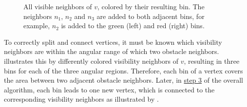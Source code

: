 			\begin{figure}[h]
				\begin{figcenter}
				\end{figcenter}
				\caption[Example of vertices sorted into obstacle neighbor-based bins.]{
					All visible neighbors of $v$, colored by their resulting bin.
					The neighbors $n_1$, $n_2$ and $n_3$ are added to both adjacent bins, for example, $n_2$ is added to the green (left) and red (right) bins.
				}
				\label{fig:visibility-bin-sorting}
			\end{figure}
			
			To correctly split and connect vertices, it must be known which visibility neighbors are within the angular range of which two obstacle neighbors.
			 illustrates this by differently colored visibility neighbors of $v$, resulting in three bins for each of the three angular regions.
			Therefore, each bin of a vertex covers the area between two adjacent obstacle neighbors.
			Later, in \hyperref[subsec:step-3-graph-creation]{step 3} of the overall algorithm, each bin leads to one new vertex, which is connected to the corresponding visibility neighbors as illustrated by .
			
